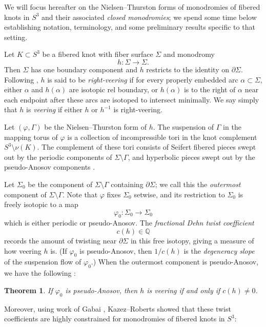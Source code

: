 \documentclass[11pt]{amsart}
\newtheorem {theorem}{Theorem}
\numberwithin{equation}{section}
\numberwithin{theorem}{section}
\theoremstyle{definition}
\newcommand{\Q}{\mathbb{Q}}
\begin{document}
We will focus hereafter on the Nielsen--Thurston forms of monodromies of fibered knots in $S^3$ and their associated \emph{closed monodromies}; we spend some time below establishing notation, terminology, and some preliminary results specific to that setting.

Let $K\subset S^3$ be a fibered knot with fiber surface $\Sigma$ and monodromy \[h:\Sigma\to \Sigma.\] Then  $\Sigma$ has one boundary component and $h$ restricts to the identity on $\partial\Sigma$. Following \cite{hkm-veering},   $h$ is said to be  \emph{right-veering} if for every properly embedded arc $\alpha \subset \Sigma$, either $\alpha$ and $h(\alpha)$ are isotopic rel boundary, or  $h(\alpha)$ is  to the right of $\alpha$ near each endpoint after these arcs are isotoped to intersect minimally. We say simply that $h$ is  \emph{veering} if either $h$ or $h^{-1}$ is right-veering.

Let $(\varphi, \Gamma)$ be the Nielsen--Thurston form of $h$. The suspension of $\Gamma$ in the mapping torus of $\varphi$ is a collection of incompressible tori in the knot complement $S^3 \setminus \nu(K)$. The complement of these tori consists of Seifert fibered pieces swept out by the periodic components of $\Sigma\setminus \Gamma$, and hyperbolic pieces swept out by the pseudo-Anosov components \cite{thurston-fiber}. 

Let  $\Sigma_0$ be the component of $\Sigma \setminus \Gamma$ containing $\partial \Sigma$; we call this the \emph{outermost} component of $\Sigma \setminus \Gamma$.  Note that  $\varphi$ fixes $\Sigma_0$ setwise, and its restriction to $\Sigma_0$ is  freely isotopic to a map  \[\varphi_0: \Sigma_0 \to \Sigma_0\] which is either periodic or pseudo-Anosov. The \emph{fractional Dehn twist coefficient} \cite{hkm-veering} \[c(h)\in \Q\]  records the amount of twisting near $\partial \Sigma$ in this free isotopy, giving a measure of how veering $h$ is.  (If $\varphi_0$ is pseudo-Anosov, then $1/c(h)$ is the \emph{degeneracy slope} \cite{gabai-oertel} of the suspension flow of $\varphi_0$.)  When the outermost component is pseudo-Anosov, we have the following \cite[\S3]{hkm-veering}:

\begin{theorem} \label{thm:fdtc-veering}
If $\varphi_0$ is pseudo-Anosov, then $h$ is veering if and only if $c(h)\neq 0$.
\end{theorem}

Moreover, using work of Gabai \cite{gabai-problems}, Kazez--Roberts showed  \cite[Theorem~4.5]{kazez-roberts} that these twist coefficients are highly constrained for monodromies of fibered knots in $S^3$: 
\end{document}
